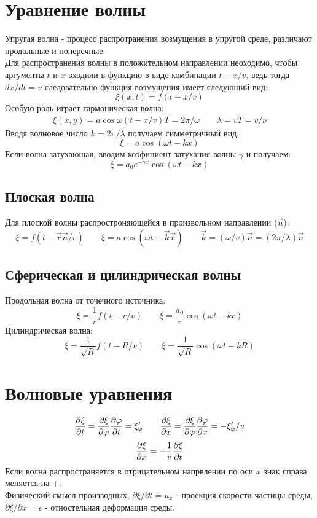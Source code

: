 \documentclass{article}
\begin{document}
\section{Уравнение волны}
Упругая волна - процесс распротранения возмущения в упругой среде,
различают продольные и поперечные. \\
Для распространения волны в положительном направлении неоходимо,
чтобы аргументы $t$ и $x$ входили в функцию в виде комбинации $t-x/v$,
ведь тогда $dx/dt=v$ следовательно функция возмущения имеет следующий вид:
\[
 \xi(x,t)=f(t-x/v) 
\]
Особую роль играет гармоническая волна:
\begin{gather*}
  \xi(x,y)=a\cos \omega(t-x/v)
  T=2\pi/\omega \qquad \lambda=vT=v/\nu
\end{gather*}
Вводя волновое число $k=2\pi/\lambda$ получаем симметричный вид:
\[
  \xi=a\cos(\omega t-kx)
\]
Если волна затухающая, вводим коэфициент затухания волны $\gamma$ и получаем:
\[
  \xi=a_0 e^{-\gamma x}\cos(\omega t -kx)
\]
\subsection{Плоская волна}
Для плоской волны распростроняющейся в произвольном направлении ($\vec{n}$):
\[
  \xi=f(t-\vec{r}\vec{n}/v) \qquad \xi=a\cos(\omega t - \vec{k}\vec{r}) \qquad \vec{k}=(\omega/v)\vec{n}=(2\pi/\lambda)\vec{n}
\]
\subsection{Сферическая и цилиндрическая волны}
Продольная волна от точечного источника:
\[
  \xi=\frac{1}{r}f(t-r/v) \qquad \xi=\frac{a_0}{r}\cos(\omega t - kr)
\]
Цилиндрическая волна:
\[
  \xi=\frac{1}{\sqrt{R}}f(t-R/v) \qquad \xi=\frac{1}{\sqrt{R}}\cos(\omega t - kR)
\]

\section{Волновые уравнения}
\begin{equation} \label{eq:2.1}
  \frac{\partial{\xi}}{\partial{t}}=\frac{\partial{\xi}}{\partial{\varphi}}\frac{\partial{\varphi}}{\partial{t}}=\xi_\varphi' \qquad \frac{\partial{\xi}}{\partial{x}}=\frac{\partial{\xi}}{\partial{\varphi}}\frac{\partial{\varphi}}{\partial{x}}=-\xi_\varphi'/v \\ 
\end{equation}
\begin{equation} \label{eq:wave_diff}
  \frac{\partial{\xi}}{\partial{x}}=-\frac{1}{v}\frac{\partial{\xi}}{\partial{t}}
\end{equation}
Если волна распространяется в отрицательном напрвлении по оси $x$ знак справа меняется на $+$. \\ 
Физический смысл производных, $\partial\xi/\partial t=u_x$ - проекция скорости частицы среды,
$\partial\xi/\partial x=\epsilon$ - отностельная деформация среды.
\end{document}
